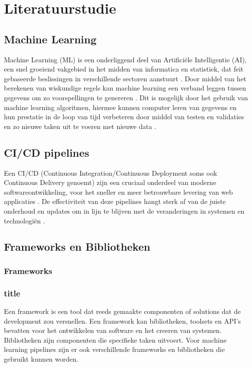 
\section{Literatuurstudie}%
\label{sec:state-of-the-art}

\subsection{Machine Learning}
Machine Learning (ML) is een onderliggend deel van Artificiële Intelligentie (AI), een snel groeiend vakgebied in het midden van informatica en statistiek, dat feit gebaseerde beslissingen in verschillende sectoren aanstuurt \autocite{Jordan2015}.
Door middel van het berekenen van wiskundige regels kan machine learning een verband leggen tussen gegevens om zo voorspellingen te genereren \autocite{Cybenko2001}.
Dit is mogelijk door het gebruik van machine learning algoritmen, hiermee kunnen computer leren van gegevens en hun prestatie in de loop van tijd verbeteren door middel van testen en validaties en zo nieuwe taken uit te voeren met nieuwe data \autocite{Shaveta2023}.
\subsection{CI/CD pipelines}
Een CI/CD (Continuous Integration/Continuous Deployment soms ook Continuous Delivery genoemt) zijn een cruciaal onderdeel van moderne softwareontwikkeling, voor het sneller en meer betrouwbare levering van web applicaties \autocite{Singh2023}.
De effectiviteit van deze pipelines hangt sterk af van de juiste onderhoud en updates om in lijn te blijven met de veranderingen in systemen en technologiën \autocite{Zampetti2021}.

\subsection{Frameworks en Bibliotheken}
\subsubsection{Frameworks}
\subsubsection{title}
Een framework is een tool dat reeds gemaakte componenten of solutions dat de development zou versnellen. Een framework kan bibliotheken, toolsets en API's bevatten voor het ontwikkelen van software en het creeren van systemen.
Bibliotheken zijn componenten die specifieke taken uitvoert. 
Voor machine learning pipelines zijn er ook verschillende frameworks en bibliotheken die gebruikt kunnen worden.

